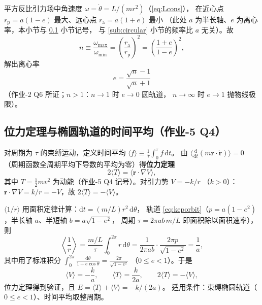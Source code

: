 \documentclass[UTF8,a4paper,11pt]{ctexart}
\begin{document}
平方反比引力场中角速度 $\omega=\dot\theta=L/(mr^2)$（\eqref{eq:Lcons}），
在近心点 $r_{\mathrm p}=a(1-e)$ 最大、远心点 $r_{\mathrm a}=a(1+e)$ 最小
（此处 $a$ 为半长轴、$e$ 为离心率，本小节与 \ref{sub:virial} 小节记号，
与 \ref{sub:circular} 小节的频率比 $a$ 无关）。故
\begin{equation}
  n\equiv\frac{\omega_{\max}}{\omega_{\min}}
  =\left(\frac{r_{\mathrm a}}{r_{\mathrm p}}\right)^{\!2}
  =\left(\frac{1+e}{1-e}\right)^{\!2},
  \label{eq:omegaratio}
\end{equation}
解出离心率
\begin{equation}
  \boxed{\;e=\frac{\sqrt n-1}{\sqrt n+1}\;}
  \label{eq:eratio}
\end{equation}
（作业-2 Q6 所证；$n>1$：$n\to1$ 时 $e\to0$ 圆轨道，
$n\to\infty$ 时 $e\to1$ 抛物线极限）。

\subsection{位力定理与椭圆轨道的时间平均（作业-5 Q4）}
\label{sub:virial}

对周期为 $\tau$ 的束缚运动，定义时间平均
$\langle f\rangle\equiv\frac1\tau\int_0^\tau f\,\mathrm{d}t$。
由 $\bigl\langle\frac{\mathrm{d}}{\mathrm{d}t}
(m\boldsymbol{r}\cdot\dot{\boldsymbol{r}})\bigr\rangle=0$
（周期函数全周期平均下导数的平均为零）得\textbf{位力定理}
\begin{equation}
  2\langle T\rangle=\bigl\langle\boldsymbol{r}\cdot\nabla V\bigr\rangle,
  \label{eq:virial}
\end{equation}
其中 $T=\frac12mv^2$ 为动能（作业-5 Q4 记号）。对引力势 $V=-k/r$
（$k>0$）：$\boldsymbol{r}\cdot\nabla V=k/r=-V$，故
$2\langle T\rangle=-\langle V\rangle$。

$\langle1/r\rangle$ 用面积定律计算：$\mathrm{d}t=(m/L)r^2\,\mathrm{d}\theta$，
轨道 \eqref{eq:keporbit}（$p=a(1-e^2)$，半长轴 $a$、半短轴 $b=a\sqrt{1-e^2}$，
周期 $\tau=2\pi ab\,m/L$ 即面积除以面积速率），则
\begin{equation}
  \left\langle\frac1r\right\rangle
  =\frac{m/L}{\tau}\int_0^{2\pi}\!r\,\mathrm{d}\theta
  =\frac{1}{2\pi ab}\cdot\frac{2\pi p}{\sqrt{1-e^2}}
  =\frac{1}{a},
  \label{eq:invr}
\end{equation}
其中用了标准积分
$\int_0^{2\pi}\frac{\mathrm{d}\theta}{1+e\cos\theta}=\frac{2\pi}{\sqrt{1-e^2}}$
（$0\le e<1$）。于是
\begin{equation}
  \langle V\rangle=-\frac{k}{a},
  \qquad
  \langle T\rangle=\frac{k}{2a},
  \qquad
  2\langle T\rangle=-\langle V\rangle,
  \label{eq:virialkepler}
\end{equation}
位力定理得到验证，且 $E=\langle T\rangle+\langle V\rangle=-k/(2a)$。
适用条件：束缚椭圆轨道（$0\le e<1$）、时间平均取整周期。
\end{document}
